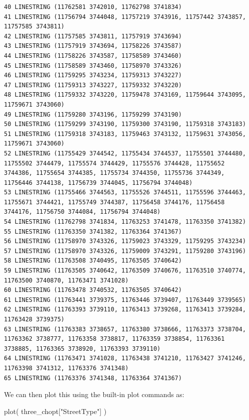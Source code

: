 \documentclass[
  letterpaper,
]{book}
\newenvironment{Shaded}{\begin{snugshade}}{\end{snugshade}}
\newcommand{\FunctionTok}[1]{\textcolor[rgb]{0.28,0.35,0.67}{#1}}
\newcommand{\NormalTok}[1]{\textcolor[rgb]{0.00,0.23,0.31}{#1}}
\newcommand{\StringTok}[1]{\textcolor[rgb]{0.13,0.47,0.30}{#1}}
\begin{document}
\begin{verbatim}
40 LINESTRING (11762581 3742010, 11762798 3741834) 
41 LINESTRING (11756794 3744048, 11757219 3743916, 11757442 3743857, 11757585 3743811) 
42 LINESTRING (11757585 3743811, 11757919 3743694) 
43 LINESTRING (11757919 3743694, 11758226 3743587) 
44 LINESTRING (11758226 3743587, 11758589 3743460) 
45 LINESTRING (11758589 3743460, 11758970 3743326) 
46 LINESTRING (11759295 3743234, 11759313 3743227) 
47 LINESTRING (11759313 3743227, 11759332 3743220) 
48 LINESTRING (11759332 3743220, 11759478 3743169, 11759644 3743095, 11759671 3743060) 
49 LINESTRING (11759280 3743196, 11759299 3743190) 
50 LINESTRING (11759299 3743190, 11759300 3743190, 11759318 3743183) 
51 LINESTRING (11759318 3743183, 11759463 3743132, 11759631 3743056, 11759671 3743060) 
52 LINESTRING (11755429 3744542, 11755434 3744537, 11755501 3744480, 11755502 3744479, 11755574 3744429, 11755576 3744428, 11755652 3744386, 11755654 3744385, 11755734 3744350, 11755736 3744349, 11756446 3744138, 11756739 3744045, 11756794 3744048) 
53 LINESTRING (11755466 3744563, 11755526 3744511, 11755596 3744463, 11755671 3744421, 11755749 3744387, 11756458 3744176, 11756458 3744176, 11756750 3744084, 11756794 3744048) 
54 LINESTRING (11762798 3741834, 11763253 3741478, 11763350 3741382) 
55 LINESTRING (11763350 3741382, 11763364 3741367) 
56 LINESTRING (11758970 3743326, 11759023 3743329, 11759295 3743234) 
57 LINESTRING (11758970 3743326, 11759009 3743291, 11759280 3743196) 
58 LINESTRING (11763508 3740495, 11763505 3740642) 
59 LINESTRING (11763505 3740642, 11763509 3740676, 11763510 3740774, 11763500 3740870, 11763471 3741028) 
60 LINESTRING (11763478 3740532, 11763505 3740642) 
61 LINESTRING (11763441 3739375, 11763446 3739407, 11763449 3739565) 
62 LINESTRING (11763393 3739110, 11763413 3739268, 11763413 3739284, 11763428 3739375) 
63 LINESTRING (11763383 3738657, 11763380 3738666, 11763373 3738704, 11763362 3738777, 11763358 3738817, 11763359 3738854, 11763361 3738885, 11763365 3738920, 11763393 3739110) 
64 LINESTRING (11763471 3741028, 11763438 3741210, 11763427 3741246, 11763398 3741312, 11763376 3741348) 
65 LINESTRING (11763376 3741348, 11763364 3741367) 
\end{verbatim}

We can then plot this using the built-in plot commands as:

\begin{Shaded}
\begin{Highlighting}[]
\FunctionTok{plot}\NormalTok{( three\_chopt[}\StringTok{"StreetType"}\NormalTok{] )}
\end{Highlighting}
\end{Shaded}
\end{document}
